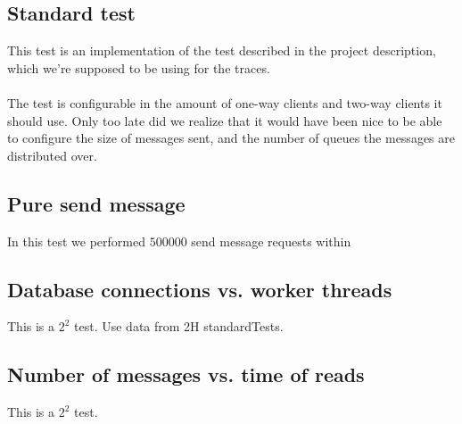 \documentclass{article}
\begin{document}
        \subsection{Standard test}
            This test is an implementation of the test described in the project description, which we're supposed to be using for the traces.\\
            \\
            The test is configurable in the amount of one-way clients and two-way clients it should use. Only too late did we realize that it would have been nice to be able to configure the size of messages sent, and the number of queues the messages are distributed over.

        \subsection{Pure send message}
            In this test we performed $500000$ send message requests within 

        \subsection{Database connections vs. worker threads}
            This is a $2^2$ test. Use data from 2H standardTests.

        \subsection{Number of messages vs. time of reads}
            This is a $2^2$ test.
\end{document}
